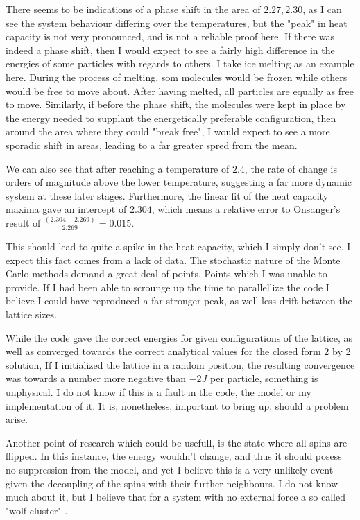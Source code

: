 \documentclass[10pt, twocolumn]{revtex4-1}
\begin{document}
There seems to be indications of a phase shift in the area of $2.27, 2.30$, as I can see the system behaviour differing over the temperatures, but the "peak"
in heat capacity is not very pronounced, and is not a reliable proof here. If there was indeed a phase shift, then I would expect to see a fairly high
difference in the energies of some particles with regards to others. I take ice melting as an example here. During the process of melting, som molecules
would be frozen while others would be free to move about. After having melted, all particles are equally as free to move. Similarly, if before the phase
shift, the molecules were kept in place by the energy needed to supplant the energetically preferable configuration, then around the area where they could
"break free", I would expect to see a more sporadic shift in areas, leading to a far greater spred from the mean.

We can also see that after reaching a temperature of $2.4$, the rate of change is orders of magnitude above the lower temperature, suggesting a far more
dynamic system at these later stages. Furthermore, the linear fit of the heat capacity maxima gave an intercept of $2.304$, which means a relative error to
Onsanger's result of $\frac{(2.304 - 2.269)}{ 2.269 } = 0.015$.

This should lead to quite a spike in the heat capacity, which I
simply don't see. I expect this fact comes from a lack of data. The stochastic nature of the Monte Carlo methods demand a great deal of points. Points which I
was unable to provide. If I had been able to scrounge up the time to parallellize the code I believe I could have reproduced a far stronger peak, as well less
drift between the lattice sizes.

While the code gave the correct energies for given configurations of the lattice, as well as converged towards the correct analytical values for the closed
form 2 by 2 solution, If I initialized the lattice in a random position, the resulting convergence was towards a number more negative than $-2J$ per particle,
something is unphysical. I do not know if this is a fault in the code, the model or my implementation of it. It is, nonetheless, important to bring up, should
a problem arise.

Another point of research which could be usefull, is the state where all spins are flipped. In this instance, the energy wouldn't change, and thus it should
posess no suppression from the model, and yet I believe this is a very unlikely event given the decoupling of the spins with their further neighbours. I do
not know much about it, but I believe that for a system with no external force a so called "wolf cluster" \cite{WolfCluster}.
\end{document}
